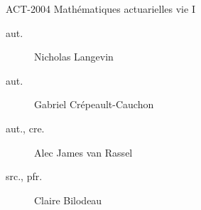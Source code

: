 \begin{contrib}{ACT-2004\: Mathématiques actuarielles vie I}
\begin{description}
	\item[aut.] Nicholas Langevin
	\item[aut.] Gabriel Crépeault-Cauchon 
	\item[aut., cre.] Alec James van Rassel
	\item[src., pfr.]	Claire Bilodeau
\end{description}
\end{contrib}
